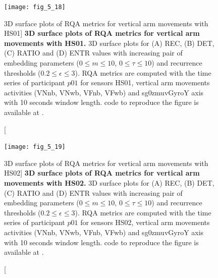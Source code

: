 \begin{figure}
\centering
\texttt{[image: fig\_5\_18]}
    \caption
	[3D surface plots of RQA metrics for vertical arm movements with HS01]{
	{\bf 3D surface plots of RQA metrics for vertical arm movements with HS01.}
	3D surface plots for (A) REC, (B) DET, (C) RATIO and (D) ENTR values 
	with increasing pair of embedding parameters 
	($0 \le m \le 10$, $0 \le \tau \le 10$) 
	and recurrence thresholds ($ 0.2 \le \epsilon \le 3 $).
	RQA metrics are computed with the time series of participant $p01$ 
	for sensors HS01, vertical arm movements activities 
	(VNnb, VNwb, VFnb, VFwb) and 
	sg0zmuvGyroY axis with 10 seconds window length. 
 	\R code to reproduce the figure is available at 
	.
	}
\label{fig:topo_s_hs01_V_w500}
\end{figure}


\begin{figure}
\centering
\texttt{[image: fig\_5\_19]}
    \caption
	[3D surface plots of RQA metrics for vertical arm movements with HS02]{
	{\bf 3D surface plots of RQA metrics for vertical arm movements with HS02.}
	3D surface plots for (A) REC, (B) DET, (C) RATIO and (D) ENTR values 
	with increasing pair of embedding parameters 
	($0 \le m \le 10$, $0 \le \tau \le 10$) 
	and recurrence thresholds ($ 0.2 \le \epsilon \le 3 $).
	RQA metrics are computed with the time series of participant $p01$ 
	for sensors HS02, vertical arm movements activities 
	(VNnb, VNwb, VFnb, VFwb) and 
	sg0zmuvGyroY axis with 10 seconds window length. 
 	\R code to reproduce the figure is available at 
	.
	}
\label{fig:topo_s_hs02_V_w500}
\end{figure}

\newpage
